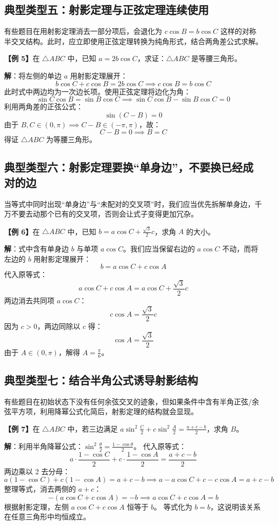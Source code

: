 \documentclass[11pt, a4paper]{ctexart}
\begin{document}
\subsection{典型类型五：射影定理与正弦定理连续使用}
有些题目在用射影定理消去一部分项后，会退化为 $c\cos B = b\cos C$ 这样的对称半交叉结构。此时，应立即使用正弦定理转换为纯角形式，结合两角差公式求解。
\begin{tcolorbox}[colback=white, colframe=black!60, boxrule=0.5pt, arc=1pt, before skip=0.2em, after skip=0.2em]
\textbf{【例 5】}在 $\triangle ABC$ 中，已知 $a = 2b\cos C$，求证：$\triangle ABC$ 是等腰三角形。
\end{tcolorbox}
\textbf{解}：将左侧的单边 $a$ 用射影定理展开：
\[
b\cos C + c\cos B = 2b\cos C \implies c\cos B = b\cos C
\]
此时式中两边均为一次边长项。使用正弦定理将边化为角：
\[
\sin C\cos B = \sin B\cos C \implies \sin C\cos B - \sin B\cos C = 0
\]
利用两角差的正弦公式：
\[
\sin(C-B) = 0
\]
由于 $B, C \in (0, \pi) \implies C-B \in (-\pi, \pi)$，故：
\[
C - B = 0 \implies B = C
\]
得证 $\triangle ABC$ 为等腰三角形。

\subsection{典型类型六：射影定理要换“单身边”，不要换已经成对的边}
当等式中同时出现“单身边”与“未配对的交叉项”时，我们应当优先拆解单身边，千万不要去动那个已有的交叉项，否则会让式子变得更加冗杂。
\begin{tcolorbox}[colback=white, colframe=black!60, boxrule=0.5pt, arc=1pt, before skip=0.2em, after skip=0.2em]
\textbf{【例 6】}在 $\triangle ABC$ 中，已知 $b = a\cos C + \frac{\sqrt{3}}{2}c$，求角 $A$ 的大小。
\end{tcolorbox}
\textbf{解}：式中含有单身边 $b$ 与单项 $a\cos C$。我们应当保留右边的 $a\cos C$ 不动，而将左边的 $b$ 用射影定理展开：
\[
b = a\cos C + c\cos A
\]
代入原等式：
\[
a\cos C + c\cos A = a\cos C + \frac{\sqrt{3}}{2}c
\]
两边消去共同项 $a\cos C$：
\[
c\cos A = \frac{\sqrt{3}}{2}c
\]
因为 $c > 0$，两边同除以 $c$ 得：
\[
\cos A = \frac{\sqrt{3}}{2}
\]
由于 $A \in (0, \pi)$，解得 $A = \frac{\pi}{6}$。

\subsection{典型类型七：结合半角公式诱导射影结构}
有些题目在初始状态下没有任何余弦交叉的迹象，但如果条件中含有半角正弦/余弦平方项，利用降幂公式化简后，射影定理的结构就会显现。
\begin{tcolorbox}[colback=white, colframe=black!60, boxrule=0.5pt, arc=1pt, before skip=0.2em, after skip=0.2em]
\textbf{【例 7】}在 $\triangle ABC$ 中，若三边满足 $a\sin^2\frac{C}{2} + c\sin^2\frac{A}{2} = \frac{a+c-b}{2}$，求角 $B$。
\end{tcolorbox}
\textbf{解}：利用半角降幂公式：$\sin^2\frac{\theta}{2} = \frac{1-\cos\theta}{2}$。
代入原等式：
\[
a \cdot \frac{1-\cos C}{2} + c \cdot \frac{1-\cos A}{2} = \frac{a+c-b}{2}
\]
两边乘以 2 去分母：
\[
a(1-\cos C) + c(1-\cos A) = a+c-b \implies a - a\cos C + c - c\cos A = a+c-b
\]
整理等式，消去两侧的 $a+c$：
\[
-(a\cos C + c\cos A) = -b \implies a\cos C + c\cos A = b
\]
根据射影定理，左侧 $a\cos C + c\cos A$ 恒等于 $b$。
等式化为 $b = b$，这说明该关系在任意三角形中均恒成立。
\end{document}
